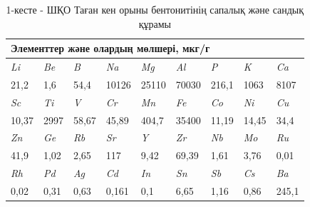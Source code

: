 \begin{table}[H]
\caption*{1-кесте - ШҚО Таған кен орыны бентонитінің сапалық және сандық құрамы}
\centering
\begin{tabular}{|lllllllll|}
\hline
\multicolumn{9}{|l|}{Элементтер және олардың мөлшері, мкг/г} \\ \hline
\multicolumn{1}{|l|}{\textit{Li}} & \multicolumn{1}{l|}{\textit{Be}} & \multicolumn{1}{l|}{\textit{B}} & \multicolumn{1}{l|}{\textit{Na}} & \multicolumn{1}{l|}{\textit{Mg}} & \multicolumn{1}{l|}{\textit{Al}} & \multicolumn{1}{l|}{\textit{P}} & \multicolumn{1}{l|}{\textit{K}} & \textit{Ca} \\ \hline
\multicolumn{1}{|l|}{21,2} & \multicolumn{1}{l|}{1,6} & \multicolumn{1}{l|}{54,4} & \multicolumn{1}{l|}{10126} & \multicolumn{1}{l|}{25110} & \multicolumn{1}{l|}{70030} & \multicolumn{1}{l|}{216,1} & \multicolumn{1}{l|}{1063} & 8107 \\ \hline
\multicolumn{1}{|l|}{\textit{Sc}} & \multicolumn{1}{l|}{\textit{Ti}} & \multicolumn{1}{l|}{\textit{V}} & \multicolumn{1}{l|}{\textit{Cr}} & \multicolumn{1}{l|}{\textit{Mn}} & \multicolumn{1}{l|}{\textit{Fe}} & \multicolumn{1}{l|}{\textit{Co}} & \multicolumn{1}{l|}{\textit{Ni}} & \textit{Cu} \\ \hline
\multicolumn{1}{|l|}{10,37} & \multicolumn{1}{l|}{2997} & \multicolumn{1}{l|}{58,67} & \multicolumn{1}{l|}{45,89} & \multicolumn{1}{l|}{404,7} & \multicolumn{1}{l|}{35400} & \multicolumn{1}{l|}{11,19} & \multicolumn{1}{l|}{14,45} & 34,4 \\ \hline
\multicolumn{1}{|l|}{\textit{Zn}} & \multicolumn{1}{l|}{\textit{Ge}} & \multicolumn{1}{l|}{\textit{Rb}} & \multicolumn{1}{l|}{\textit{Sr}} & \multicolumn{1}{l|}{\textit{Y}} & \multicolumn{1}{l|}{\textit{Zr}} & \multicolumn{1}{l|}{\textit{Nb}} & \multicolumn{1}{l|}{\textit{Mo}} & \textit{Ru} \\ \hline
\multicolumn{1}{|l|}{41,9} & \multicolumn{1}{l|}{1,02} & \multicolumn{1}{l|}{2,65} & \multicolumn{1}{l|}{117} & \multicolumn{1}{l|}{9,42} & \multicolumn{1}{l|}{69,39} & \multicolumn{1}{l|}{1,61} & \multicolumn{1}{l|}{3,76} & 0,01 \\ \hline
\multicolumn{1}{|l|}{\textit{Rh}} & \multicolumn{1}{l|}{\textit{Pd}} & \multicolumn{1}{l|}{\textit{Ag}} & \multicolumn{1}{l|}{\textit{Cd}} & \multicolumn{1}{l|}{\textit{In}} & \multicolumn{1}{l|}{\textit{Sn}} & \multicolumn{1}{l|}{\textit{Sb}} & \multicolumn{1}{l|}{\textit{Cs}} & \textit{Ba} \\ \hline
\multicolumn{1}{|l|}{0,02} & \multicolumn{1}{l|}{0,31} & \multicolumn{1}{l|}{0,63} & \multicolumn{1}{l|}{0,161} & \multicolumn{1}{l|}{0,1} & \multicolumn{1}{l|}{6,65} & \multicolumn{1}{l|}{1,16} & \multicolumn{1}{l|}{0,86} & 245,1 \\ \hline
\end{tabular}
\end{table}

